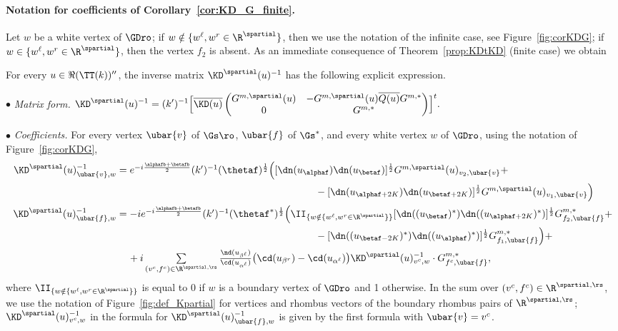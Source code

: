 \documentclass[a4paper,twoside,11pt]{article}
\begin{document}
\paragraph{Notation for coefficients of Corollary~\ref{cor:KD_G_finite}.} Let $w$ be a white vertex of $\GDro$; if 
$w\notin\{w^\ell,w^r\in\R^\spartial\}$, then we use the notation of the infinite case, see Figure~\ref{fig:corKDG};
if $w\in\{w^\ell,w^r\in\R^\spartial\}$, then the vertex $f_2$ is absent.
As an immediate consequence of Theorem~\ref{prop:KDtKD} (finite case) we obtain
\begin{cor}\label{cor:KD_G_finite}
For every $u\in\Re(\TT(k))''$, the inverse matrix $\KD^\spartial(u)^{-1}$ has the following explicit expression.

$\bullet$ \emph{Matrix form.}
$\displaystyle
\KD^\spartial(u)^{-1}=(k')^{-1}
\Bigl[\overline{\KD(u)}
\begin{pmatrix}
G^{m,\spartial}(u) & -G^{m,\spartial}(u)\overline{Q(u)}G^{m,*}\\
0 & G^{m,*}
\end{pmatrix}\Bigr]^t.
$

$\bullet$ \emph{Coefficients.} For every vertex $\ubar{v}$ of $\Gs\ro$, $\ubar{f}$ of $\Gs^*$, and every white vertex $w$ of $\GDro$, 
using the notation of Figure~\ref{fig:corKDG},
\begin{align*}
\KD^\spartial(u)^{-1}_{\ubar{v},w}&\textstyle =e^{-i\frac{\alphafb+\betafb}{2}}(k')^{-1}\sc(\thetaf)^{\frac{1}{2}}
\Bigl([\dn(u_{\alphaf})\dn(u_{\betaf})]^{\frac{1}{2}} G^{m,\spartial}(u)_{v_2,\ubar{v}}+\\
&\hspace{7cm}-
[\dn(u_{\alphaf+2K})\dn(u_{\betaf+2K})]^{\frac{1}{2}}G^{m,\spartial}(u)_{v_1,\ubar{v}}\Bigr)\\
\KD^\spartial(u)^{-1}_{\ubar{f},w}&\textstyle =-ie^{-i\frac{\alphafb+\betafb}{2}}(k')^{-1}\sc(\thetaf^*)^{\frac{1}{2}}
\Bigl(\II_{\{w\notin\{w^\ell,w^r\in \R^\spartial\}\}}[\dn((u_{\betaf})^*)\dn((u_{\alphaf+2K})^*)]^{\frac{1}{2}}G^{m,*}_{f_2,\ubar{f}}+\\
&\textstyle\hspace{7cm}-[\dn((u_{\betaf-2K})^*)\dn((u_{\alphaf})^*)]^{\frac{1}{2}}G^{m,*}_{f_1,\ubar{f}}\Bigl)+\\
&\hspace{0.4cm}\textstyle+i \sum\limits_{(v^c,f^c)\in\R^{\spartial,\rs}}\frac{\nd(u_{\beta^\ell})}{\cd(u_{\alpha^\ell})}\bigl(\cd(u_{\beta^r})-\cd(u_{\alpha^\ell})\bigr)
\KD^{\spartial}(u)^{-1}_{v^c,w}\cdot G^{m,*}_{f^c,\ubar{f}},
\end{align*}
where $\II_{\{w\notin \{w^\ell,w^r\in \R^\spartial\}\}}$ is equal to 0 if $w$ is a boundary vertex of $\GDro$ and 1 otherwise.
In the sum over $(v^c,f^c)\in\R^{\spartial,\rs}$, we use the notation of 
Figure~\ref{fig:def_Kpartial} for vertices and rhombus vectors of the boundary rhombus pairs of $\R^{\spartial,\rs}$;
$\KD^{\spartial}(u)^{-1}_{v^c,w}$ in the formula for $\KD^\spartial(u)^{-1}_{\ubar{f},w}$ is given by the first formula with $\ubar{v}=v^c$.
\end{cor}
\end{document}
